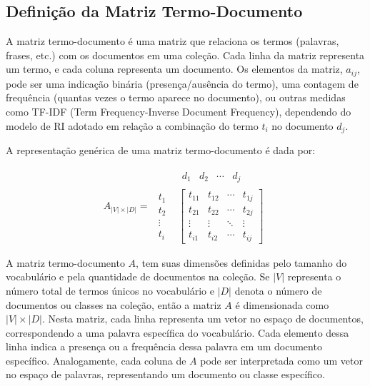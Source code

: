 \subsection{Definição da Matriz Termo-Documento}

A matriz termo-documento é uma matriz que relaciona os termos (palavras, frases, etc.) com os documentos em uma coleção. Cada linha da matriz representa um termo, e cada coluna representa um documento. Os elementos da matriz, \( a_{ij} \), pode ser uma indicação binária (presença/ausência do termo), uma contagem de frequência (quantas vezes o termo aparece no documento), ou outras medidas como TF-IDF (Term Frequency-Inverse Document Frequency), dependendo do modelo de RI adotado em relação a combinação do termo \( t_i \) no documento \( d_j \).

A representação genérica de uma matriz termo-documento é dada por:

\begin{equation}
A_{|V| \times |D|} = 
\begin{array}{cc}
    & \begin{matrix} d_1 & d_2 & \cdots & d_j \end{matrix} \\
\begin{matrix} t_1 \\ t_2 \\ \vdots \\ t_i \end{matrix} & \left[ \begin{matrix} t_{11} & t_{12} & \cdots & t_{1j} \\ t_{21} & t_{22} & \cdots & t_{2j} \\ \vdots & \vdots & \ddots & \vdots \\ t_{i1} & t_{i2} & \cdots & t_{ij} \end{matrix} \right]
\end{array}
\end{equation}

A matriz termo-documento \( A \), tem suas dimensões definidas pelo tamanho do vocabulário e pela quantidade de documentos na coleção. Se \( |V| \) representa o número total de termos únicos no vocabulário e \( |D| \) denota o número de documentos ou classes na coleção, então a matriz \( A \) é dimensionada como \( |V| \times |D| \). Nesta matriz, cada linha representa um vetor no espaço de documentos, correspondendo a uma palavra específica do vocabulário. Cada elemento dessa linha indica a presença ou a frequência dessa palavra em um documento específico. Analogamente, cada coluna de \( A \) pode ser interpretada como um vetor no espaço de palavras, representando um documento ou classe específico.


